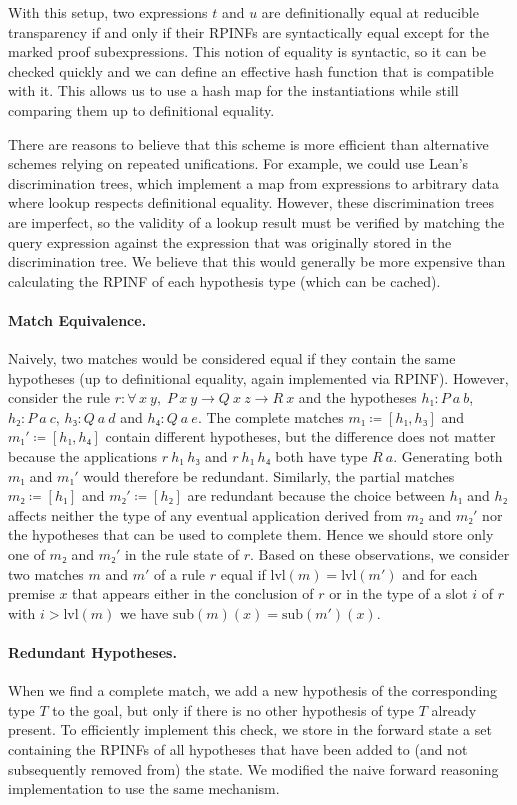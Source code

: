 \documentclass[runningheads,leqno]{llncs}
\newcommand{\para}[1]{\paragraph{\bfseries\upshape #1}}
\newcommand{\All}[2]{\ensuremath{\forall\, #1,\; #2}}
\newcommand{\sub}{\ensuremath{\mathrm{sub}}}
\newcommand{\lvl}{\ensuremath{\mathrm{lvl}}}
\begin{document}
With this setup, two expressions $t$ and $u$ are definitionally equal at reducible transparency if and only if their RPINFs are syntactically equal except for the marked proof subexpressions.
This notion of equality is syntactic, so it can be checked quickly and we can define an effective hash function that is compatible with it.
This allows us to use a hash map for the instantiations while still comparing them up to definitional equality.

There are reasons to believe that this scheme is more efficient than alternative schemes relying on repeated unifications.
For example, we could use Lean's discrimination trees, which implement a map from expressions to arbitrary data where lookup respects definitional equality.
However, these discrimination trees are imperfect, so the validity of a lookup result must be verified by matching the query expression against the expression that was originally stored in the discrimination tree.
We believe that this would generally be more expensive than calculating the RPINF of each hypothesis type (which can be cached).

\para{Match Equivalence.}
Naively, two matches would be considered equal if they contain the same hypotheses (up to definitional equality, again implemented via RPINF).
However, consider the rule $r : \All{x~y}{P~x~y → Q~x~z → R~x}$ and the hypotheses $h₁ : P~a~b$, $h₂ : P~a~c$, $h₃ : Q~a~d$ and $h₄ : Q~a~e$.
The complete matches $m₁ ≔ [h₁, h₃]$ and $m₁' ≔ [h₁, h₄]$ contain different hypotheses, but the difference does not matter because the applications $r~h₁~h₃$ and $r~h₁~h₄$ both have type $R~a$.
Generating both $m₁$ and $m₁'$ would therefore be redundant.
Similarly, the partial matches $m₂ ≔ [h₁]$ and $m₂' ≔ [h₂]$ are redundant because the choice between $h₁$ and $h₂$ affects neither the type of any eventual application derived from $m₂$ and $m₂'$ nor the hypotheses that can be used to complete them.
Hence we should store only one of $m₂$ and $m₂'$ in the rule state of $r$.
Based on these observations, we consider two matches $m$ and $m'$ of a rule $r$ equal if $\lvl(m) = \lvl(m')$ and for each premise $x$ that appears either in the conclusion of $r$ or in the type of a slot $i$ of $r$ with $i > \lvl(m)$ we have $\sub(m)(x) = \sub(m')(x)$.

\para{Redundant Hypotheses.}
When we find a complete match, we add a new hypothesis of the corresponding type $T$ to the goal, but only if there is no other hypothesis of type $T$ already present.
To efficiently implement this check, we store in the forward state a set containing the RPINFs of all hypotheses that have been added to (and not subsequently removed from) the state.
We modified the naive forward reasoning implementation to use the same mechanism.
\end{document}
